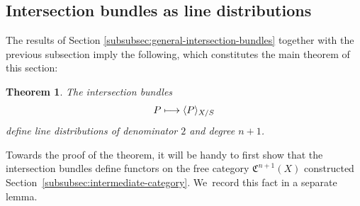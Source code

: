 \documentclass[JEP,XML,SOM,Unicode,published]{cedram}
\newcommand\mto{\mathchoice{\longmapsto}{\mapsto}{\mapsto}{\mapsto}}
\theoremstyle{plain}
\newtheorem{theorem}{Theorem}[section]
\theoremstyle{definition}
\newcommand{\Cfrak}{\mathfrak C}
\begin{document}
\subsection{Intersection bundles as line distributions}\label{subsec:Intbunaslindib}

The results of Section \ref{subsubsec:general-intersection-bundles} together with the previous subsection imply the following, which constitutes the main theorem of this section:

\begin{theorem}\label{thm:Elkik-distribution}
The intersection bundles
\begin{displaymath}
P \mto \langle P \rangle_{X/S}
\end{displaymath} define line distributions of denominator $2$ and degree $n+1$.
\end{theorem}

Towards the proof of the theorem, it will be handy to first show that the intersection bundles define functors on the free category $\Cfrak^{n+1}(X)$ constructed Section~\ref{subsubsec:intermediate-category}. We~record this fact in a separate lemma.
\end{document}
